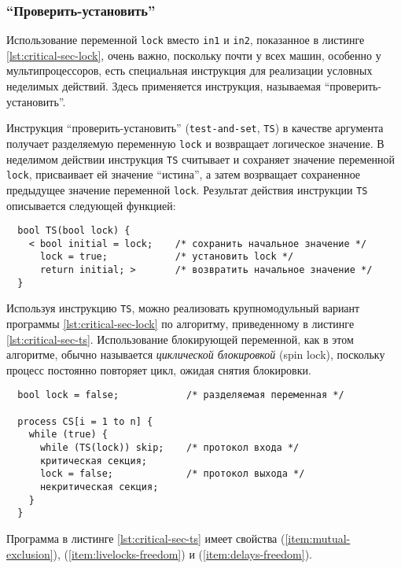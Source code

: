 \subsubsection{``Проверить-установить''}

Использование переменной \texttt{lock} вместо \texttt{in1} и \texttt{in2},
показанное в листинге \ref{lst:critical-sec-lock}, очень важно, поскольку почти
у всех машин, особенно у мультипроцессоров, есть специальная инструкция для
реализации условных неделимых действий. Здесь применяется инструкция, называемая
``проверить-установить''.

Инструкция ``проверить-установить'' (\texttt{test-and-set}, \texttt{TS}) в
качестве аргумента получает разделяемую переменную \texttt{lock} и возвращает
логическое значение. В неделимом действии инструкция \texttt{TS} считывает и
сохраняет значение переменной \texttt{lock}, присваивает ей значение ``истина'',
а затем возрващает сохраненное предыдущее значение переменной
\texttt{lock}. Результат действия инструкции \texttt{TS} описывается следующей
функцией:

\lstset{caption=}
\begin{lstlisting}
  bool TS(bool lock) {
    < bool initial = lock;    /* сохранить начальное значение */
      lock = true;            /* установить lock */
      return initial; >       /* возвратить начальное значение */
  }
\end{lstlisting}

Используя инструкцию \texttt{TS}, можно реализовать крупномодульный вариант
программы \ref{lst:critical-sec-lock} по алгоритму, приведенному в листинге
\ref{lst:critical-sec-ts}. Использование блокирующей переменной, как в этом
алгоритме, обычно называется \emph{циклической блокировкой} (spin lock),
поскольку процесс постоянно повторяет цикл, ожидая снятия блокировки.

\lstset{label=lst:critical-sec-ts,
  caption=Критические секции на основе инструкции ``проверить и установить''}
\begin{lstlisting}
  bool lock = false;            /* разделяемая переменная */

  process CS[i = 1 to n] {
    while (true) {
      while (TS(lock)) skip;    /* протокол входа */
      критическая секция;
      lock = false;             /* протокол выхода */
      некритическая секция;
    }
  }
\end{lstlisting}

Программа в листинге \ref{lst:critical-sec-ts} имеет свойства
(\ref{item:mutual-exclusion}), (\ref{item:livelocks-freedom}) и
(\ref{item:delays-freedom}).

